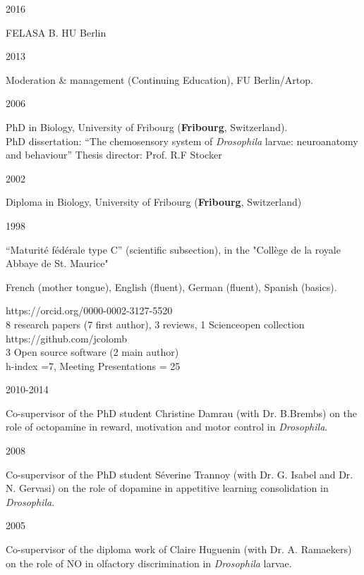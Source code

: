 \parbox{0.15\textwidth}{2016}\hfill
\parbox[t]{0.83\textwidth}{FELASA B. HU Berlin
        }
\parbox{0.15\textwidth}{2013}\hfill
\parbox[t]{0.83\textwidth}{Moderation \& management (Continuing Education), FU Berlin/Artop.
        }
\parbox{0.15\textwidth}{2006}\hfill
\parbox[t]{0.83\textwidth}{PhD in Biology,
        University of Fribourg (\textbf{Fribourg}, Switzerland).\\
        PhD dissertation: ``The chemosensory system of \textit{Drosophila} larvae: neuroanatomy and behaviour''
        Thesis director: Prof. R.F Stocker}
\parbox{0.15\textwidth}{2002}\hfill
\parbox[t]{0.83\textwidth}{Diploma in Biology,
        University of Fribourg (\textbf{Fribourg}, Switzerland)
        }
\parbox{0.15\textwidth}{1998}\hfill
\parbox[t]{0.83\textwidth}{``Maturit\'e f\'ed\'erale type C'' (scientific subsection),
in the "Coll\`ege de la royale Abbaye de St. Maurice"}

 French (mother tongue), English (fluent),
German (fluent), Spanish (basics).

%
 https://orcid.org/0000-0002-3127-5520\\
  8 research papers (7 first author), 3 reviews, 1 Scienceopen collection\\
 https://github.com/jcolomb\\
 3 Open source software (2 main author)\\
h-index =7,
Meeting Presentations = 25




\parbox{0.15\textwidth}{2010-2014}\hfill
	\parbox[t]{0.83\textwidth}{Co-supervisor of the PhD student Christine Damrau
(with Dr. B.Brembs) on the role of octopamine in reward, motivation and motor control in  \textit{Drosophila}.}
\parbox{0.15\textwidth}{2008}\hfill
	\parbox[t]{0.83\textwidth}{Co-supervisor of the PhD student S\'everine Trannoy
(with Dr. G. Isabel and Dr. N. Gervasi) on the role of dopamine in appetitive learning consolidation in  \textit{Drosophila}.}
\parbox{0.15\textwidth}{2005}\hfill
\parbox[t]{0.83\textwidth}{Co-supervisor of the diploma work of Claire Huguenin
(with Dr. A. Ramaekers) on the role of NO in olfactory discrimination in \textit{Drosophila} larvae.}





